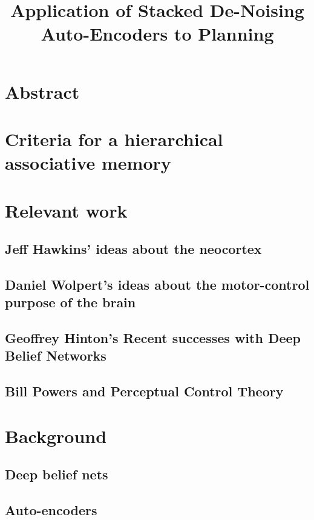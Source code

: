 \documentclass[12pt]{article}
\begin{document}
         

\section{Abstract}
\label{Abstract}
\doublespacing

\title{Application of Stacked De-Noising Auto-Encoders to Planning}

\section{Criteria for a hierarchical associative memory}

\section{Relevant work}
 
	\subsection{Jeff Hawkins' ideas about the neocortex}

	\subsection{Daniel Wolpert's ideas about the motor-control purpose of the brain}
		
	\subsection{Geoffrey Hinton's Recent successes with Deep Belief Networks}

	\subsection{Bill Powers and Perceptual Control Theory}
		
\section{Background}

	\subsection{Deep belief nets}

	\subsection{Auto-encoders}
\end{document}
